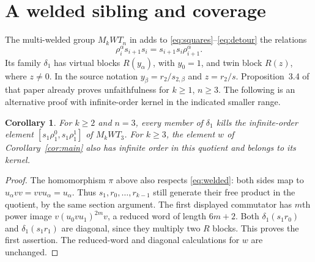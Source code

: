 \documentclass[11pt]{article}
\newtheorem{corollary}[theorem]{Corollary}
\begin{document}
\section{A welded sibling and coverage}
The multi-welded group $M_kWT_n$ in \cite[Definition~2.1]{NO}
adds to \eqref{eq:squares}--\eqref{eq:detour} the relations
\begin{equation}\label{eq:welded}
 \rho_i^\alpha s_{i+1}s_i=s_{i+1}s_i\rho_{i+1}^\alpha.
\end{equation}
Its family $\delta_1$ \cite[Theorem~3.2]{NO} has virtual blocks
$R(y_\alpha)$, with $y_0=1$, and twin block $R(z)$, where $z\ne0$.
In the source notation $y_\beta=r_2/s_{2,\beta}$ and $z=r_2/s$.
Proposition~3.4 of that paper already proves unfaithfulness for
$k\ge1$, $n\ge3$. The following is an alternative proof with
infinite-order kernel in the indicated smaller range.

\begin{corollary}\label{cor:welded}
For $k\ge2$ and $n=3$, every member of $\delta_1$ kills the
infinite-order element $[s_1\rho_1^0,s_1\rho_1^1]$ of $M_kWT_3$.
For $k\ge3$, the element $w$ of Corollary~\ref{cor:main} also
has infinite order in this quotient and belongs to its kernel.
\end{corollary}
\begin{proof}
The homomorphism $\pi$ above also respects \eqref{eq:welded}:
both sides map to $u_\alpha vv=vvu_\alpha=u_\alpha$.
Thus $s_1,r_0,\ldots,r_{k-1}$ still generate their free product
in the quotient, by the same section argument.
The first displayed commutator has $m$th power image
$v(u_0vu_1)^{2m}v$, a reduced word of length $6m+2$.
Both $\delta_1(s_1r_0)$ and $\delta_1(s_1r_1)$ are diagonal,
since they multiply two $R$ blocks. This proves the first assertion.
The reduced-word and diagonal calculations for $w$ are unchanged.
\end{proof}
\end{document}
